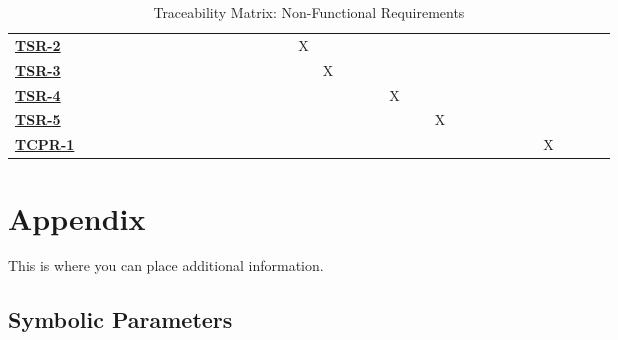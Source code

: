 \documentclass[12pt, titlepage]{article}
\begin{document}
\begin{landscape}
\begin{table}[H]
\begin{adjustbox}{width=1.2\textwidth}
\begin{tabular}{l|ccccccccccccccccccccccccc}
        \hyperref[TSR-2]{\textbf{TSR-2}}  & ~ & ~ & ~ & ~ & ~ & ~ & ~ & ~ & ~ & ~ & X & ~ & ~ & ~ & ~ & ~ & ~ & ~ & ~ & ~ & ~ & ~ & ~\\
        \hyperref[TSR-3]{\textbf{TSR-3}}  & ~ & ~ & ~ & ~ & ~ & ~ & ~ & ~ & ~ & ~ & ~ & X & ~ & ~ & ~ & ~ & ~ & ~ & ~ & ~ & ~ & ~ & ~\\
        \hyperref[TSR-4]{\textbf{TSR-4}}  & ~ & ~ & ~ & ~ & ~ & ~ & ~ & ~ & ~ & ~ & ~ & ~ & ~ & ~ & X & ~ & ~ & ~ & ~ & ~ & ~ & ~ & ~\\
        \hyperref[TSR-5]{\textbf{TSR-5}}  & ~ & ~ & ~ & ~ & ~ & ~ & ~ & ~ & ~ & ~ & ~ & ~ & ~ & ~ & ~ & ~ & X & ~ & ~ & ~ & ~ & ~ & ~\\
        \hyperref[TCPR-1]{\textbf{TCPR-1}}  & ~ & ~ & ~ & ~ & ~ & ~ & ~ & ~ & ~ & ~ & ~ & ~ & ~ & ~ & ~ & ~ & ~ & ~ & ~ & ~ & ~ &  X\\
    \end{tabular}
    \end{adjustbox}
    \caption{Traceability Matrix: Non-Functional Requirements}
    \label{Traceability Matrix: Non-Functional Requirements}
\end{table}
\end{landscape}
\pagestyle{plain}%
\clearpage

				




\newpage

\section{Appendix}

This is where you can place additional information.

\subsection{Symbolic Parameters}
\end{document}

